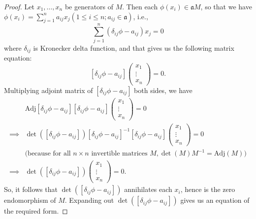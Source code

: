 \begin{proof}
    Let \(x_1, \ldots, x_n\) be generators of \(M\). Then each \(\phi(x_i) \in \mathfrak{a}M\), so that we have \(\phi(x_i) = \sum_{j=1}^n a_{ij}x_j (1 \le i \le n; a_{ij} \in \mathfrak{a})\), i.e., \[\sum_{j=1}^n (\delta_{ij}\phi - a_{ij})x_j = 0\]
    where \(\delta_{ij}\) is Kronecker delta function, and that gives us the following matrix equation:
    \[[\delta_{ij} \phi - a_{ij}] \begin{pmatrix}
    x_1\\
    \vdots\\
    x_n
\end{pmatrix} = 0.\]
Multiplying adjoint matrix of \([\delta_{ij}\phi - a_{ij}]\) both sides, we have
\begin{align*}
    &\text{Adj}[\delta_{ij} \phi - a_{ij}] [\delta_{ij} \phi - a_{ij}] \begin{pmatrix}
    x_1\\
    \vdots\\
    x_n
\end{pmatrix}= 0\\
    \implies &\det\left([\delta_{ij} \phi - a_{ij}]\right) [\delta_{ij} \phi - a_{ij}]^{-1} [\delta_{ij} \phi - a_{ij}]\begin{pmatrix}
    x_1\\
    \vdots\\
    x_n
\end{pmatrix}  = 0\\
&\text{(because for all $n \times n$ invertible matrices $M, \det(M) M^{-1} = \text{Adj}(M)$)}\\ 
        \implies &\det([\delta_{ij} \phi - a_{ij}]) \begin{pmatrix}
    x_1\\
    \vdots\\
    x_n
\end{pmatrix} = 0.
\end{align*}
So, it follows that \(\det([\delta_{ij}\phi - a_{ij}])\) annihilates each \(x_i\), hence is the zero endomorphism of \(M\). Expanding out \(\det([\delta_{ij}\phi - a_{ij}])\) gives us an equation of the required form. 
\end{proof}
